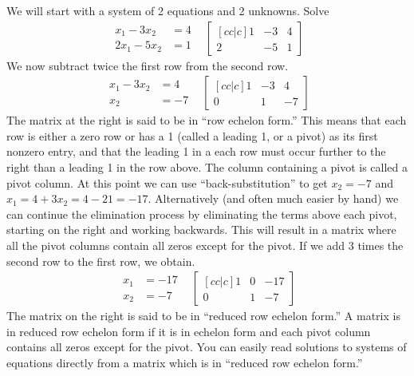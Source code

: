 \documentclass[10pt]{article}
\begin{document}
We will start with a system of 2 equations and 2 unknowns. 
Solve $$
\begin{array}{rr}
\begin{array}{rl}
x_1-3x_2&=4\\
2x_1-5x_2&=1 
\end{array}
&
\begin{bmatrix}[cc|c] 1&-3&4\\2&-5&1
\end{bmatrix} 
\end{array}
$$
We now subtract twice the first row from the second row.
$$\begin{array}{rr}
\begin{array}{rl}
x_1-3x_2&=4\\
x_2&=-7 
\end{array}
&
\begin{bmatrix}[cc|c] 1&-3&4\\0&1&-7
\end{bmatrix} 
\end{array}
$$
The matrix at the right is said to be in ``row echelon form.'' This means that each row is either a zero row or has a 1 (called a leading 1, or a pivot) as its first nonzero entry, and that the leading 1 in a each row must occur further to the right than a leading 1 in the row above. The column containing a pivot is called a pivot column. At this point we can use ``back-substitution'' to get {$x_2=-7$} and {$x_1=4+3x_2 = 4-21=-17$}. Alternatively (and often much easier by hand) we can continue the elimination process by eliminating the terms above each pivot, starting on the right and working backwards. This will result in a matrix where all the pivot columns contain all zeros except for the pivot. If we add 3 times the second row to the first row, we obtain.
{$$\begin{array}{rr}
\begin{array}{rl}
x_1&=-17\\
x_2&=-7 
\end{array}
&
\begin{bmatrix}[cc|c] 1&0&-17\\0&1&-7
\end{bmatrix} 
\end{array}
$$}
The matrix on the right is said to be in ``reduced row echelon form.'' A matrix is in reduced row echelon form if it is in echelon form and each pivot column contains all zeros except for the pivot. You can easily read solutions to systems of equations directly from a matrix which is in ``reduced row echelon form.''
\end{document}
